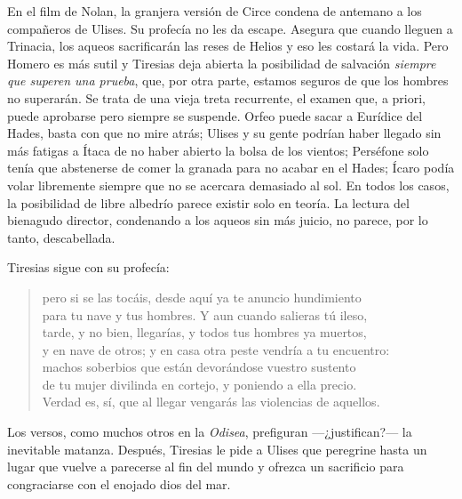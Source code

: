 En el film de Nolan, la granjera versión de Circe condena de antemano a los compañeros de Ulises. Su profecía no les da escape. Asegura que cuando lleguen a Trinacia, los aqueos sacrificarán las reses de Helios y eso les costará la vida. Pero Homero es más sutil y Tiresias deja abierta la posibilidad de salvación \emph{siempre que superen una prueba}, que, por otra parte, estamos seguros de que los hombres no superarán. Se trata de una vieja treta recurrente, el examen que, a priori, puede aprobarse pero siempre se suspende. Orfeo puede sacar a Eurídice del Hades, basta con que no mire atrás; Ulises y su gente podrían haber llegado sin más fatigas a Ítaca de no haber abierto la bolsa de los vientos; Perséfone solo tenía que abstenerse de comer la granada para no acabar en el Hades; Ícaro podía volar libremente siempre que no se acercara demasiado al sol. En todos los casos, la posibilidad de libre albedrío parece existir solo en teoría. La lectura del bienagudo director, condenando a los aqueos sin más juicio, no parece, por lo tanto, descabellada.

Tiresias sigue con su profecía:

\begin{verse}
pero si se las tocáis, desde aquí ya te anuncio hundimiento\\
para tu nave y tus hombres. Y aun cuando salieras tú ileso,\\
tarde, y no bien, llegarías, y todos tus hombres ya muertos,\\
y en nave de otros; y en casa otra peste vendría a tu encuentro:\\
machos soberbios que están devorándose vuestro sustento\\
de tu mujer divilinda en cortejo, y poniendo a ella precio.\\
Verdad es, sí, que al llegar vengarás las violencias de aquellos.
\end{verse}

Los versos, como muchos otros en la \emph{Odisea}, prefiguran ---¿justifican?--- la inevitable matanza. Después, Tiresias le pide a Ulises que peregrine hasta un lugar que vuelve a parecerse al fin del mundo y ofrezca un sacrificio para congraciarse con el enojado dios del mar.

